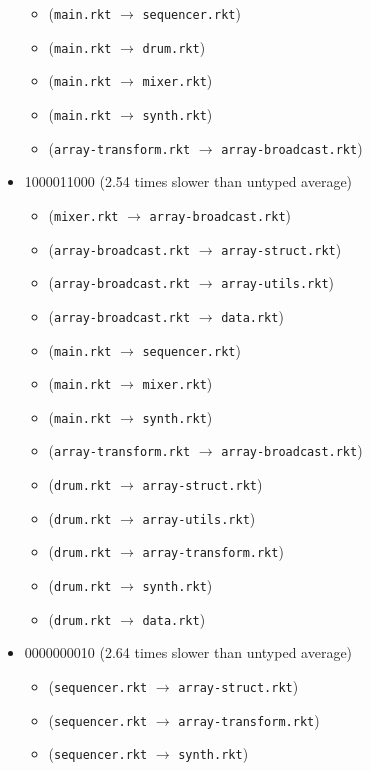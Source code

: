 \documentclass{article}
\newcommand{\mono}[1]{\texttt{#1}}
\begin{document}
\begin{itemize}
\begin{itemize}
  \item (\mono{main.rkt} $\rightarrow$ \mono{sequencer.rkt})
  \item (\mono{main.rkt} $\rightarrow$ \mono{drum.rkt})
  \item (\mono{main.rkt} $\rightarrow$ \mono{mixer.rkt})
  \item (\mono{main.rkt} $\rightarrow$ \mono{synth.rkt})
  \item (\mono{array-transform.rkt} $\rightarrow$ \mono{array-broadcast.rkt})
  \end{itemize}
\item 1000011000 (2.54 times slower than untyped average)
  \begin{itemize}
  \item (\mono{mixer.rkt} $\rightarrow$ \mono{array-broadcast.rkt})
  \item (\mono{array-broadcast.rkt} $\rightarrow$ \mono{array-struct.rkt})
  \item (\mono{array-broadcast.rkt} $\rightarrow$ \mono{array-utils.rkt})
  \item (\mono{array-broadcast.rkt} $\rightarrow$ \mono{data.rkt})
  \item (\mono{main.rkt} $\rightarrow$ \mono{sequencer.rkt})
  \item (\mono{main.rkt} $\rightarrow$ \mono{mixer.rkt})
  \item (\mono{main.rkt} $\rightarrow$ \mono{synth.rkt})
  \item (\mono{array-transform.rkt} $\rightarrow$ \mono{array-broadcast.rkt})
  \item (\mono{drum.rkt} $\rightarrow$ \mono{array-struct.rkt})
  \item (\mono{drum.rkt} $\rightarrow$ \mono{array-utils.rkt})
  \item (\mono{drum.rkt} $\rightarrow$ \mono{array-transform.rkt})
  \item (\mono{drum.rkt} $\rightarrow$ \mono{synth.rkt})
  \item (\mono{drum.rkt} $\rightarrow$ \mono{data.rkt})
  \end{itemize}
\item 0000000010 (2.64 times slower than untyped average)
  \begin{itemize}
  \item (\mono{sequencer.rkt} $\rightarrow$ \mono{array-struct.rkt})
  \item (\mono{sequencer.rkt} $\rightarrow$ \mono{array-transform.rkt})
  \item (\mono{sequencer.rkt} $\rightarrow$ \mono{synth.rkt})

\end{itemize}
\end{itemize}
\end{document}

